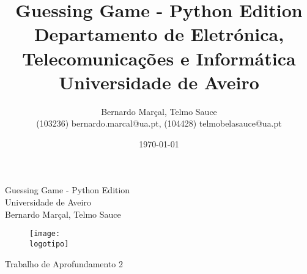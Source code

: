 \documentclass{report}
\begin{document}
%
\def\titulo{Guessing Game - Python Edition}
\def\data{\today}
\def\autores{Bernardo Marçal, Telmo Sauce}
\def\autorescontactos{(103236) bernardo.marcal@ua.pt, (104428) telmobelasauce@ua.pt}
\def\versao{Trabalho de Aprofundamento 2}
\def\departamento{Departamento de Eletrónica, Telecomunicações e Informática}
\def\empresa{Universidade de Aveiro}
\def\logotipo{ua.pdf}
%
%
\renewcommand{\contentsname}{Índice}
\begin{titlepage}

\begin{center}
%
\vspace*{50mm}
%
{\Huge \titulo}\\ 
%
\vspace{10mm}
%
{\Large \empresa}\\
%
\vspace{10mm}
%
{\LARGE \autores}\\ 
%
\vspace{30mm}
%
\begin{figure}[h]
\center
\texttt{[image: \\logotipo]}
\end{figure}
%
\vspace{30mm}
\end{center}
%
\begin{flushright}
\versao
\end{flushright}
\end{titlepage}

\title{%
{\Huge\textbf{\titulo}}\\
{\Large \departamento\\ \empresa}
}
%
\author{%
    \autores \\
    \autorescontactos
}
%
\date{\data}
%
\maketitle

\end{document}
